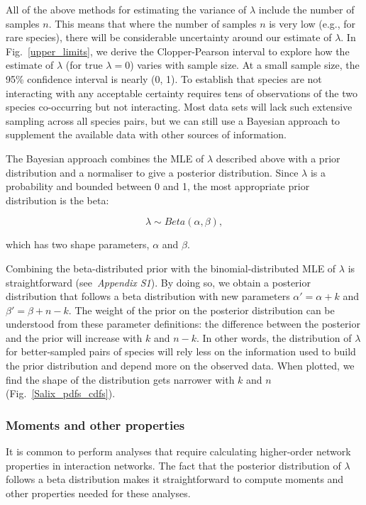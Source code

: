 \documentclass[12pt]{article}
\begin{document}
\begin{spacing}{2.0}
    All of the above methods for estimating the variance of $\lambda$ include the number of samples $n$. This means that where the number of samples $n$ is very low (e.g., for rare species), there will be considerable uncertainty around our estimate of $\lambda$. In Fig.~\ref{upper_limits}, we derive the Clopper-Pearson interval to explore how the estimate of $\lambda$ (for true $\lambda = 0$) varies with sample size. At a small sample size, the 95\% confidence interval is nearly (0, 1). To establish that species are not interacting with any acceptable certainty requires tens of observations of the two species co-occurring but not interacting. Most data sets will lack such extensive sampling across all species pairs, but we can still use a Bayesian approach to supplement the available data with other sources of information.


    The Bayesian approach combines the MLE of $\lambda$ described above with a prior distribution and a normaliser to give a posterior distribution. Since $\lambda$ is a probability and bounded between 0 and 1, the most appropriate prior distribution is the beta: 

    \begin{equation}
          \lambda \sim Beta(\alpha,\beta) , \label{prior}
        \end{equation}

        \noindent which has two shape parameters, $\alpha$ and $\beta$. 

    Combining the beta-distributed prior with the binomial-distributed MLE of $\lambda$ is straightforward (see~\emph{Appendix S1}). By doing so, we obtain a posterior distribution that follows a beta distribution with new parameters $\alpha'= \alpha+k$ and $\beta'=\beta+n-k$. The weight of the prior on the posterior distribution can be understood from these parameter definitions: the difference between the posterior and the prior will increase with $k$ and $n-k$. In other words, the distribution of $\lambda$ for better-sampled pairs of species will rely less on the information used to build the prior distribution and depend more on the observed data. When plotted, we find the shape of the distribution gets narrower with $k$ and $n$ (Fig.~\ref{Salix_pdfs_cdfs}). 


    \subsubsection*{Moments and other properties}

      It is common to perform analyses that require calculating higher-order network properties in interaction networks. The fact that the posterior distribution of $\lambda$ follows a beta distribution makes it straightforward to compute moments and other properties needed for these analyses. 



\end{spacing}
\end{document}
